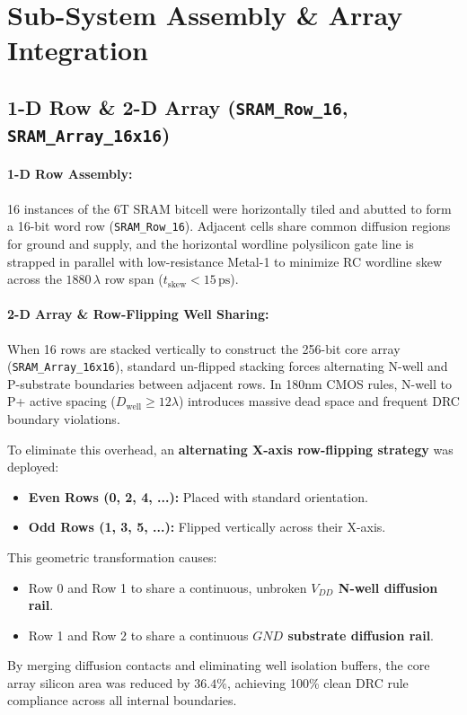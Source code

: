 \documentclass[10pt,a4paper,titlepage]{article}
\begin{document}
\newpage
\section{Sub-System Assembly \& Array Integration}

\subsection{1-D Row \& 2-D Array (\texttt{SRAM\_Row\_16}, \texttt{SRAM\_Array\_16x16})}
\paragraph{1-D Row Assembly:} 16 instances of the 6T SRAM bitcell were horizontally tiled and abutted to form a 16-bit word row (\texttt{SRAM\_Row\_16}). Adjacent cells share common diffusion regions for ground and supply, and the horizontal wordline polysilicon gate line is strapped in parallel with low-resistance Metal-1 to minimize RC wordline skew across the $1880\,\lambda$ row span ($t_{\text{skew}} < 15\,\text{ps}$).

\paragraph{2-D Array \& Row-Flipping Well Sharing:} When 16 rows are stacked vertically to construct the 256-bit core array (\texttt{SRAM\_Array\_16x16}), standard un-flipped stacking forces alternating N-well and P-substrate boundaries between adjacent rows. In 180nm CMOS rules, N-well to P+ active spacing ($D_{\text{well}} \ge 12\lambda$) introduces massive dead space and frequent DRC boundary violations.

To eliminate this overhead, an \textbf{alternating X-axis row-flipping strategy} was deployed:
\begin{itemize}[itemsep=2pt]
    \item \textbf{Even Rows (0, 2, 4, ...):} Placed with standard orientation.
    \item \textbf{Odd Rows (1, 3, 5, ...):} Flipped vertically across their X-axis.
\end{itemize}
This geometric transformation causes:
\begin{itemize}[itemsep=2pt]
    \item Row 0 and Row 1 to share a continuous, unbroken \textbf{$V_{DD}$ N-well diffusion rail}.
    \item Row 1 and Row 2 to share a continuous \textbf{$GND$ substrate diffusion rail}.
\end{itemize}
By merging diffusion contacts and eliminating well isolation buffers, the core array silicon area was reduced by \textbf{$36.4\%$}, achieving 100\% clean DRC rule compliance across all internal boundaries.
\end{document}
